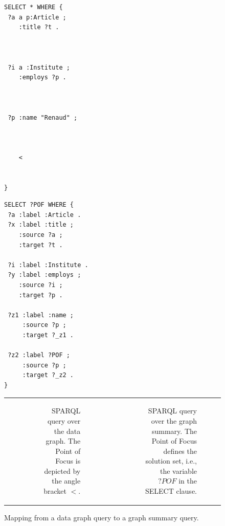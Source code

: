 \begin{figure}

	\newsavebox{\sparql}
	\begin{lrbox}{\sparql}
		\begin{minipage}{0.3\textwidth}
			\centering
			\expandafter\def\csname PY@tok@err\endcsname{}
			\begin{verbatim}
SELECT * WHERE {
 ?a a p:Article ;
    :title ?t .



 ?i a :Institute ;
    :employs ?p .



 ?p :name "Renaud" ;



    <


}
\end{verbatim}
\end{minipage}
\end{lrbox}


\newsavebox{\sparqlSum}
\begin{lrbox}{\sparqlSum}
	\begin{minipage}{0.4\textwidth}
		\centering
		\begin{verbatim}
SELECT ?POF WHERE {
 ?a :label :Article .
 ?x :label :title ;
    :source ?a ;
    :target ?t .

 ?i :label :Institute .
 ?y :label :employs ;
    :source ?i ;
    :target ?p .

 ?z1 :label :name ;
     :source ?p ;
     :target ?_z1 .

 ?z2 :label ?POF ;
     :source ?p ;
     :target ?_z2 .
}
\end{verbatim}
\end{minipage}
\end{lrbox}

\begin{tabular}{crccr}
	\phantom{a}
	&
	\begin{subfigure}[t]{.275\textwidth}
		\centering
		\usebox{\sparql}
		\caption{SPARQL query over the data graph. The Point of Focus is depicted by the angle bracket $<$.}
		\label{fig:entity-sparql}
	\end{subfigure}
	& \phantom{a} & \phantom{a} &
	\begin{subfigure}[t]{.55\textwidth}
		\centering
		\usebox{\sparqlSum}
		\caption{SPARQL query over the graph summary. The Point of Focus defines the solution set, i.e., the variable $?POF$ in the SELECT clause.}
		\label{fig:gs-sparql}
	\end{subfigure}
	\\
\end{tabular}
\caption{Mapping from a data graph query to a graph summary query.}
\label{fig:entity-gs-sparql}
\end{figure}

